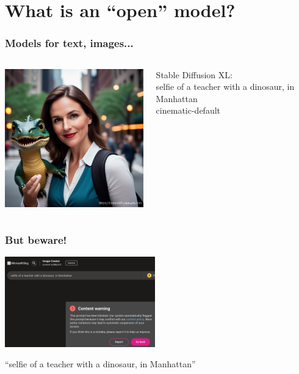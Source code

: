 \documentclass[17pt,aspectratio=169,hyperref={pdfusetitle,colorlinks,allcolors=olive}]{beamer}
\begin{document}
\section{What is an ``open'' model?}


\begin{frame}[fragile]
  \frametitle{Models for text, images...}

    \begin{columns}[T]
    \begin{column}{.58\textwidth}
        \includegraphics[width=7cm]{figs/selfie}
    \end{column}%
    \hfill%
    \begin{column}{.38\textwidth}
      {\small Stable Diffusion XL:} \\
      selfie of a teacher with a dinosaur, in Manhattan \\
      cinematic-default \\
    \end{column}%
  \end{columns}

\end{frame}

\begin{frame}[fragile]
  \frametitle{But beware!}

  \includegraphics[width=6.5cm]{figs/bing-content-warning}

  {\small
  ``selfie of a teacher with a dinosaur, in Manhattan''
}  
\end{frame}
\end{document}

